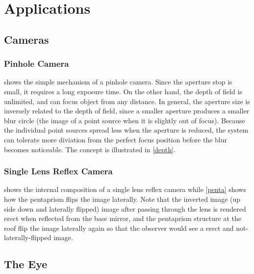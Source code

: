 \documentclass[english,a4paper,12pt]{report}
\begin{document}

\section{Applications}

\subsection{Cameras}

\subsubsection{Pinhole Camera}

 shows the simple mechanism of a pinhole camera. Since the aperture stop is small, it requires a long exposure time. On the other hand, the depth of field is unlimited, and can focus object from any distance. In general, the aperture size is inversely related to the depth of field, since a smaller aperture produces a smaller blur circle (the image of a point source when it is slightly out of focus). Because the individual point sources spread less when the aperture is reduced, the system can tolerate more diviation from the perfect focus position before the blur becomes noticeable. The concept is illustrated in \cref{depth}. 


\subsubsection{Single Lens Reflex Camera}

 shows the internal composition of a single lens reflex camera while \cref{penta} shows how the pentaprism flips the image laterally. Note that the inverted image (up side down and laterally flipped) image after passing through the lens is rendered erect when reflected from the base mirror, and the pentaprism structure at the roof flip the image laterally again so that the observer would see a erect and not-laterally-flipped image.


\subsection{The Eye}
\end{document}
